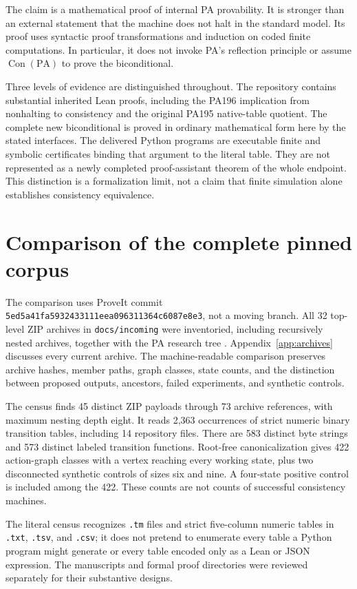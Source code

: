 \documentclass[11pt,letterpaper]{article}
\newcommand{\PA}{\mathrm{PA}}
\newcommand{\Con}{\operatorname{Con}}
\newcommand{\file}[1]{\texttt{\nolinkurl{#1}}}
\begin{document}
The claim is a mathematical proof of internal PA provability. It is stronger
than an external statement that the machine does not halt in the standard
model. Its proof uses syntactic proof transformations and induction on coded
finite computations. In particular, it does not invoke PA's reflection
principle or assume $\Con(\PA)$ to prove the biconditional.

Three levels of evidence are distinguished throughout. The repository
contains substantial inherited Lean proofs, including the PA196 implication
from nonhalting to consistency and the original PA195 native-table quotient.
The complete new biconditional is proved in ordinary mathematical form
here by the stated interfaces. The delivered Python programs are executable
finite and symbolic certificates binding that argument to the literal table.
They are not represented as a newly completed proof-assistant theorem of
the whole endpoint. This distinction is a formalization limit, not a claim
that finite simulation alone establishes consistency equivalence.

\section{Comparison of the complete pinned corpus}
\label{sec:comparison}

The comparison uses ProveIt commit
\file{5ed5a41fa5932433111eea096311364c6087e8e3}, not a moving branch.
All 32 top-level ZIP archives in \file{docs/incoming} were inventoried,
including recursively nested archives, together with the PA research tree
\cite{corpus}. Appendix~\ref{app:archives} discusses every current archive.
The machine-readable comparison preserves archive hashes, member paths,
graph classes, state counts, and the distinction between proposed outputs,
ancestors, failed experiments, and synthetic controls.

The census finds 45 distinct ZIP payloads through 73 archive references, with
maximum nesting depth eight. It reads 2,363 occurrences of strict numeric
binary transition tables, including 14 repository files. There are 583
distinct byte strings and 573 distinct labeled transition functions.
Root-free canonicalization gives 422 action-graph classes with a vertex
reaching every working state, plus two disconnected synthetic controls of
sizes six and nine. A four-state positive control is included among the 422.
These counts are not counts of successful consistency machines.

The literal census recognizes \file{.tm} files and strict five-column
numeric tables in \file{.txt}, \file{.tsv}, and \file{.csv}; it does not
pretend to enumerate every table a Python program might generate or every
table encoded only as a Lean or JSON expression. The manuscripts and formal
proof directories were reviewed separately for their substantive designs.
\end{document}
